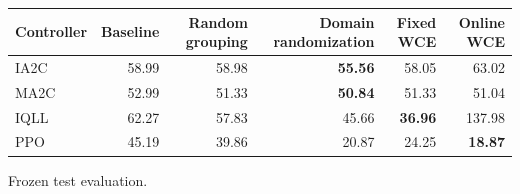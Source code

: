 \begin{tabular}{lrrrrr}
\hline
Controller & Baseline & Random grouping & Domain randomization & Fixed WCE & Online WCE \\
\hline
IA2C & 58.99 & 58.98 & \textbf{55.56} & 58.05 & 63.02 \\
MA2C & 52.99 & 51.33 & \textbf{50.84} & 51.33 & 51.04 \\
IQLL & 62.27 & 57.83 & 45.66 & \textbf{36.96} & 137.98 \\
PPO & 45.19 & 39.86 & 20.87 & 24.25 & \textbf{18.87} \\
\hline
\end{tabular}
Frozen test evaluation.
